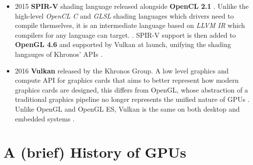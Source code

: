 \documentclass[a4paper,12pt,twoside,openright]{report}
\begin{document}
\begin{itemize}
\item 2015 \textbf{SPIR-V} shading language released alongside \textbf{OpenCL
2.1} \cite{SPIRVLaunch}. Unlike the high-level \textit{OpenCL C} and
\textit{GLSL} shading languages which drivers need to compile themselves, it is
an intermediate language based on \textit{LLVM IR} which compilers for any
language can target. \cite{LLVMIR} \cite{SPIRV}. SPIR-V support is then added
to \textbf{OpenGL 4.6} and supported by Vulkan at launch, unifying the shading
langauges of Khronos' APIs \cite{SPIRVOpenGL}. \\

\item 2016 \textbf{Vulkan} released by the Khronos Group. A low level graphics
and compute API for graphics cards that aims to better represent how modern
graphics cards are designed, this differs from OpenGL, whose abstraction of a
traditional graphics pipeline no longer represents the unified nature of GPUs
\cite{VulkanAnnouncement}. Unlike OpenGL and OpenGL ES, Vulkan is the same on
both desktop and embedded systems \cite{Vulkan}. \\


\end{itemize}




\section{A (brief) History of GPUs}
\end{document}
